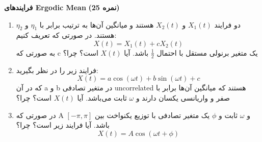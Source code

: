 \Large \textbf{فرایندهای Ergodic Mean}
\large \textbf{(25 نمره)}

\normalsize \vspace{0.5cm}

\begin{enumerate}[label=(\alph*)]
	\item
	دو فرایند
	${X_1}\left( t \right)$
	و
	${X_2}\left( t \right)$
	هستند و میانگین آن‌ها به ترتیب برابر با
	${\eta _1}$
	و
	${\eta _2}$
	هستند. در صورتی که تعریف کنیم:
	$$
	X\left( t \right) = {X_1}\left( t \right) + c{X_2}\left( t \right)
	$$
	به صورتی که c یک متغیر برنولی مستقل با احتمال
	$\frac{1}{2}$
	باشد. آیا
	$X\left( t \right)$
	است؟ چرا؟
	\item 
	فرایند زیر را در نظر بگیرید:
	$$
	X\left( t \right) = a\cos \left( {\omega t} \right) + b\sin \left( {\omega t} \right) + c
	$$
	که در آن a و b در متغیر تصادفی uncorrelated هستند که میانگین آن‌ها برابر با صفر و واریانسی یکسان دارند و
	$\omega $
	ثابت می‌باشد. آیا
	$X\left( t \right)$
	است؟ چرا؟
	\item
	در صورتی که A و 
	$\omega $
	ثابت و
	$\phi $
	یک متغیر تصادفی با توزیع یکنواخت بین
	$\left[ { - \pi ,\pi } \right]$
	باشد. آیا فرایند زیر
	است؟ چرا؟
	$$
	X\left( t \right) = A\cos \left( {\omega t + \phi } \right)
	$$
\end{enumerate}



